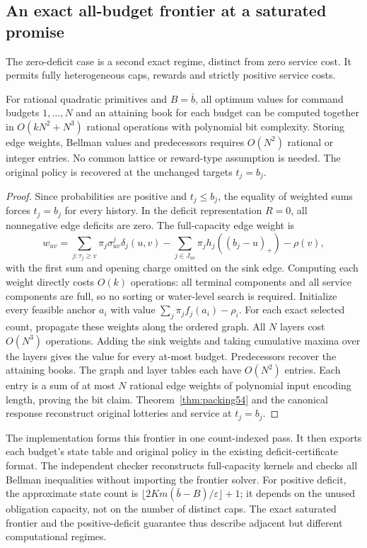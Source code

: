 \subsection{An exact all-budget frontier at a saturated promise}\label{sec:saturation58}
The zero-deficit case is a second exact regime, distinct from zero service cost. It permits fully heterogeneous caps, rewards and strictly positive service costs.
\begin{corollary}\label{cor:saturation58}
For rational quadratic primitives and $B=\bar b$, all optimum values for command budgets $1,\ldots,N$ and an attaining book for each budget can be computed together in $O(kN^2+N^3)$ rational operations with polynomial bit complexity. Storing edge weights, Bellman values and predecessors requires $O(N^2)$ rational or integer entries. No common lattice or reward-type assumption is needed. The original policy is recovered at the unchanged targets $t_j=b_j$.
\end{corollary}
\begin{proof}
Since probabilities are positive and $t_j\leq b_j$, the equality of weighted sums forces $t_j=b_j$ for every history. In the deficit representation $R=0$, all nonnegative edge deficits are zero. The full-capacity edge weight is
\[
 w_{uv}=\sum_{j:\tau_j\geq v}\pi_j\sigma^j_{uv}\delta_j(u,v)
        -\sum_{j\in J_{uv}}\pi_jh_j((b_j-u)_+)-\rho(v),
\]
with the first sum and opening charge omitted on the sink edge. Computing each weight directly costs $O(k)$ operations: all terminal components and all service components are full, so no sorting or water-level search is required. Initialize every feasible anchor $a_i$ with value $\sum_j\pi_jf_j(a_i)-\rho_i$. For each exact selected count, propagate these weights along the ordered graph. All $N$ layers cost $O(N^3)$ operations. Adding the sink weights and taking cumulative maxima over the layers gives the value for every at-most budget. Predecessors recover the attaining books. The graph and layer tables each have $O(N^2)$ entries. Each entry is a sum of at most $N$ rational edge weights of polynomial input encoding length, proving the bit claim. Theorem~\ref{thm:packing54} and the canonical response reconstruct original lotteries and service at $t_j=b_j$.
\end{proof}

The implementation forms this frontier in one count-indexed pass. It then exports each budget's state table and original policy in the existing deficit-certificate format. The independent checker reconstructs full-capacity kernels and checks all Bellman inequalities without importing the frontier solver. For positive deficit, the approximate state count is $\lfloor2Km(\bar b-B)/\varepsilon\rfloor+1$; it depends on the unused obligation capacity, not on the number of distinct caps. The exact saturated frontier and the positive-deficit guarantee thus describe adjacent but different computational regimes.
